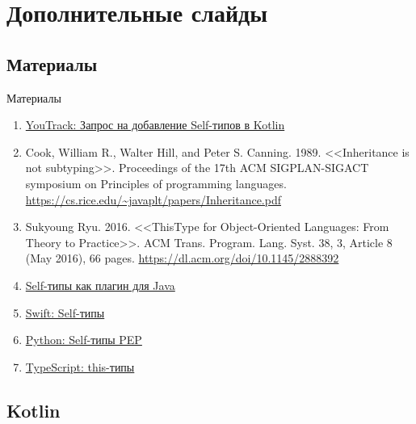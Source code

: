 \documentclass[aspectratio=169,usenames,dvipsnames]{beamer}
\begin{document}
    \appendix


    \section{Дополнительные слайды}


    \subsection{Материалы}

    \begin{frame}{Материалы}
        \begin{enumerate}
            \item \href{https://youtrack.jetbrains.com/issue/KT-6494}{\color{blue} YouTrack: Запрос на добавление Self-типов в Kotlin}
            \item Cook, William R., Walter Hill, and Peter S. Canning. 1989. <<Inheritance is not subtyping>>. Proceedings of the 17th ACM SIGPLAN-SIGACT symposium on Principles of programming languages. {\color{blue}\url{https://cs.rice.edu/~javaplt/papers/Inheritance.pdf}}
            \item Sukyoung Ryu. 2016. <<ThisType for Object-Oriented Languages: From Theory to Practice>>. ACM Trans. Program. Lang. Syst. 38, 3, Article 8 (May 2016), 66 pages. {\color{blue}\url{https://dl.acm.org/doi/10.1145/2888392}}
            \item \href{https://github.com/manifold-systems/manifold/blob/master/manifold-deps-parent/manifold-ext/README.md\#the-self-type-with-self}{\color{blue} Self-типы как плагин для Java}
            \item \href{https://docs.swift.org/swift-book/documentation/the-swift-programming-language/types/\#Self-Type}{\color{blue} Swift: Self-типы}
            \item \href{https://peps.python.org/pep-0673/}{\color{blue} Python: Self-типы PEP}
            \item \href{https://www.typescriptlang.org/docs/handbook/2/classes.html\#this-types}{\color{blue}TypeScript: this-типы}
        \end{enumerate}
    \end{frame}


    \subsection{Kotlin}
\end{document}
